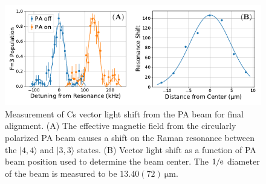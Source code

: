 \begin{figure}
  \centering
  \includegraphics[width=\textwidth]{figures/pa_vectorshift.pdf}
  \caption[PA beam alignment]{
    Measurement of Cs vector light shift from the PA beam for final alignment.
    (A) The effective magnetic field from the circularly polarized PA beam
    causes a shift on the Raman resonance between the $|4,4\rangle$ and $|3,3\rangle$ states.
    (B) Vector light shift as a function of PA beam position
    used to determine the beam center.
    The $1/\mathrm{e}$ diameter of the beam is measured to be $13.40(72)~\mathrm{\mu m}$.
    \label{fig:pa:alignment}}
\end{figure}

